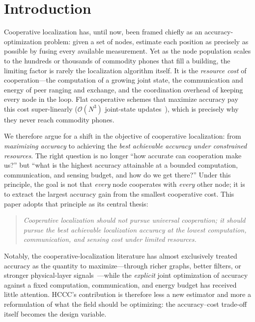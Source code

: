 \documentclass{ceurart}
\theoremstyle{definition}
\begin{document}
\maketitle

\section{Introduction}
\label{sec:intro}

Cooperative localization has, until now, been framed chiefly as an
accuracy-optimization problem: given a set of nodes, estimate each position as
precisely as possible by fusing every available measurement. Yet as the node
population scales to the hundreds or thousands of commodity phones that fill a
building, the limiting factor is rarely the localization algorithm itself. It is the
\emph{resource cost} of cooperation---the computation of a growing joint state, the
communication and energy of peer ranging and exchange, and the coordination overhead
of keeping every node in the loop. Flat cooperative schemes that maximize accuracy
pay this cost super-linearly ($\mathcal{O}(N^3)$ joint-state
updates~\cite{wymeersch2009cooperative}), which is precisely why they never reach
commodity phones.

We therefore argue for a shift in the objective of cooperative localization: from
\emph{maximizing accuracy} to achieving the \emph{best achievable accuracy under
constrained resources}. The right question is no longer ``how accurate can
cooperation make us?'' but ``what is the highest accuracy attainable at a bounded
computation, communication, and sensing budget, and how do we get there?'' Under
this principle, the goal is not that \emph{every} node cooperates with \emph{every}
other node; it is to extract the largest accuracy gain from the smallest cooperative
cost. This paper adopts that principle as its central thesis:
\begin{quote}
\emph{Cooperative localization should not pursue universal cooperation; it should
pursue the best achievable localization accuracy at the lowest computation,
communication, and sensing cost under limited resources.}
\end{quote}

Notably, the cooperative-localization literature has almost exclusively treated
accuracy as the quantity to maximize---through richer graphs, better filters, or
stronger physical-layer signals~\cite{wymeersch2009cooperative,zhou2023wifi,ye2025crowdsourced}---while
the \emph{explicit} joint optimization of accuracy against a fixed computation,
communication, and energy budget has received little attention. HCCC's contribution
is therefore less a new estimator and more a reformulation of what the field should
be optimizing: the accuracy--cost trade-off itself becomes the design variable.
\end{document}
